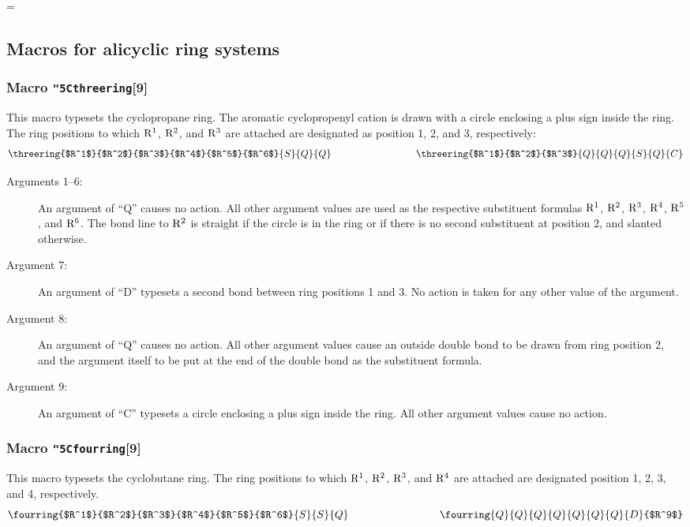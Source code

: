   =\tenrm
  \initial
  \newcommand{\ru}{No action is taken for any other value of
                   the argument}
 
\subsection{Macros for alicyclic ring systems}
\subsubsection{Macro {\tt\char"5C{}threering}[9]}
  This macro typesets the cyclopropane ring. The aromatic
 cyclopropenyl cation is drawn with a circle enclosing a plus
 sign inside the ring. The ring positions to which ${\rm R^1}$,
 ${\rm R^2}$, and ${\rm R^3}$ are attached are designated as
 position 1, 2, and 3, respectively:
 \[ \threering{$R^1$}{$R^2$}{$R^3$}{$R^4$}{$R^5$}{$R^6$}{S}{Q}{Q}
    \hspace{3cm}
    \threering{$R^1$}{$R^2$}{$R^3$}{Q}{Q}{Q}{S}{Q}{C}  \]
 
 \begin{description}
 \item[{\rm Arguments 1--6:}] An argument of ``Q''
      causes no action. All other argument values are used as
      the respective substituent formulas ${\rm R^1}$, ${\rm R^2}$,
      ${\rm R^3}$, ${\rm R^4}$, ${\rm R^5}$, and ${\rm R^6}$.
      The bond line to ${\rm R^2}$ is straight if the circle is in
      the ring or if there is no second substituent at position 2,
      and slanted otherwise.
 \item[{\rm Argument 7:}] An argument of ``D'' typesets
      a second bond between ring positions 1 and 3. \ru .
 \item[{\rm Argument 8:}] An argument of ``Q'' causes
      no action. All other argument values cause an outside double
      bond to be drawn from ring position 2, and the argument itself
      to be put at the end of the double bond as the substituent formula.
 \item[{\rm Argument 9:}] An argument of ``C'' typesets
      a circle enclosing a plus sign inside the ring. All other
      argument values cause no action.
 \end{description}
 
\subsubsection{Macro {\tt\char"5C{}fourring}[9]}
  This macro typesets the cyclobutane ring. The ring positions
 to which ${\rm R^1}$, ${\rm R^2}$, ${\rm R^3}$, and ${\rm R^4}$
 are attached are designated position 1, 2, 3, and 4, respectively.
 \[ \fourring{$R^1$}{$R^2$}{$R^3$}{$R^4$}{$R^5$}{$R^6$}{S}{S}{Q}
    \hspace{3cm}
    \fourring{Q}{Q}{Q}{Q}{Q}{Q}{Q}{D}{$R^9$} \]
 
